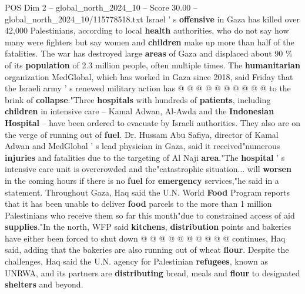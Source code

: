 \begin{textsample}{POS Dim 2 – global\_north\_2024\_10 – Score 30.00 – global\_north\_2024\_10/115778518.txt}
Israel ' s \textbf{offensive} in Gaza has killed over 42,000 Palestinians, according to local \textbf{health} authorities, who do not say how many were fighters but say women and \textbf{children} make up more than half of the fatalities.
The war has destroyed large \textbf{areas} of Gaza and displaced about 90 \% of its \textbf{population} of 2.3 million people, often multiple times.
The \textbf{humanitarian} organization MedGlobal, which has worked in Gaza since 2018, said Friday that the Israeli army ' s renewed military action has @ @ @ @ @ @ @ @ @ @ to the brink of \textbf{collapse}."Three \textbf{hospitals} with hundreds of \textbf{patients}, including \textbf{children} in intensive care -- Kamal Adwan, Al-Awda and the \textbf{Indonesian} \textbf{Hospital} -- have been ordered to evacuate by Israeli authorities.
They also are on the verge of running out of \textbf{fuel}.
Dr.
Hussam Abu Safiya, director of Kamal Adwan and MedGlobal ' s lead physician in Gaza, said it received"numerous \textbf{injuries} and fatalities due to the targeting of Al Naji \textbf{area}."The \textbf{hospital} ' s intensive care unit is overcrowded and the"catastrophic situation... will \textbf{worsen} in the coming hours if there is no \textbf{fuel} for \textbf{emergency} services,"he said in a statement.
Throughout Gaza, Haq said the U.N.
World \textbf{Food} Program reports that it has been unable to deliver \textbf{food} parcels to the more than 1 million Palestinians who receive them so far this month"due to constrained access of aid \textbf{supplies}."In the north, WFP said \textbf{kitchens}, \textbf{distribution} points and bakeries have either been forced to shut down @ @ @ @ @ @ @ @ @ @ continues, Haq said, adding that the bakeries are also running out of wheat \textbf{flour}.
Despite the challenges, Haq said the U.N. agency for Palestinian \textbf{refugees}, known as UNRWA, and its partners are \textbf{distributing} bread, meals and \textbf{flour} to designated \textbf{shelters} and beyond.

\end{textsample}
